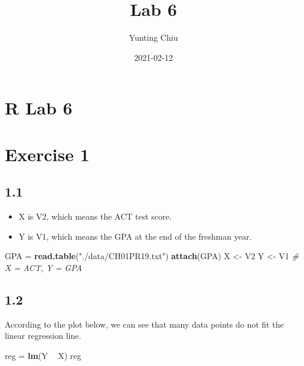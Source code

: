 \documentclass[
]{article}
\title{Lab 6}
\author{Yunting Chiu}
\date{2021-02-12}
\newenvironment{Shaded}{\begin{snugshade}}{\end{snugshade}}
\newcommand{\CommentTok}[1]{\textcolor[rgb]{0.56,0.35,0.01}{\textit{#1}}}
\newcommand{\KeywordTok}[1]{\textcolor[rgb]{0.13,0.29,0.53}{\textbf{#1}}}
\newcommand{\NormalTok}[1]{#1}
\newcommand{\OperatorTok}[1]{\textcolor[rgb]{0.81,0.36,0.00}{\textbf{#1}}}
\newcommand{\StringTok}[1]{\textcolor[rgb]{0.31,0.60,0.02}{#1}}
\providecommand{\tightlist}{%
  \setlength{\itemsep}{0pt}\setlength{\parskip}{0pt}}
\begin{document}
\maketitle

\hypertarget{r-lab-6}{%
\section{R Lab 6}\label{r-lab-6}}

\hypertarget{exercise-1}{%
\section{Exercise 1}\label{exercise-1}}

\hypertarget{section}{%
\subsection{1.1}\label{section}}

\begin{itemize}
\tightlist
\item
  X is V2, which means the ACT test score.
\item
  Y is V1, which means the GPA at the end of the freshman year.
\end{itemize}

\begin{Shaded}
\begin{Highlighting}[]
\NormalTok{GPA =}\StringTok{ }\KeywordTok{read.table}\NormalTok{(}\StringTok{"./data/CH01PR19.txt"}\NormalTok{)}
\KeywordTok{attach}\NormalTok{(GPA)}
\NormalTok{X <-}\StringTok{ }\NormalTok{V2}
\NormalTok{Y <-}\StringTok{ }\NormalTok{V1}
\CommentTok{# X = ACT, Y = GPA}
\end{Highlighting}
\end{Shaded}

\hypertarget{section-1}{%
\subsection{1.2}\label{section-1}}

According to the plot below, we can see that many data points do not fit
the linear regression line.

\begin{Shaded}
\begin{Highlighting}[]
\NormalTok{reg =}\StringTok{ }\KeywordTok{lm}\NormalTok{(Y }\OperatorTok{~}\StringTok{ }\NormalTok{X)}
\NormalTok{reg}
\end{Highlighting}
\end{Shaded}
\end{document}
